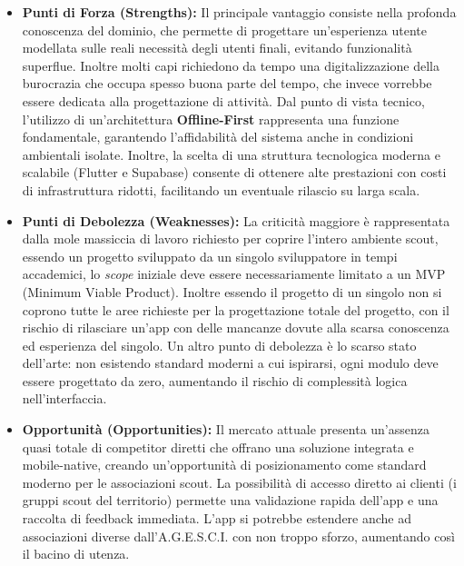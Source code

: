 \documentclass[11pt]{article}
\numberwithin{figure}{section}
\begin{document}
\begin{itemize}[topsep=0.5 pt]
  \item \textbf{Punti di Forza (Strengths):}
  Il principale vantaggio consiste nella profonda conoscenza del dominio, che permette di progettare un'esperienza utente modellata sulle reali necessità degli utenti finali, evitando funzionalità superflue. Inoltre molti capi richiedono da tempo una digitalizzazione della burocrazia che occupa spesso buona parte del tempo, che invece vorrebbe essere dedicata alla progettazione di attività. Dal punto di vista tecnico, l'utilizzo di un'architettura \textbf{Offline-First} rappresenta una funzione fondamentale, garantendo l'affidabilità del sistema anche in condizioni ambientali isolate. Inoltre, la scelta di una struttura tecnologica moderna e scalabile (Flutter e Supabase) consente di ottenere alte prestazioni con costi di infrastruttura ridotti, facilitando un eventuale rilascio su larga scala.

  \item \textbf{Punti di Debolezza (Weaknesses):}
  La criticità maggiore è rappresentata dalla mole massiccia di lavoro richiesto per coprire l'intero ambiente scout, essendo un progetto sviluppato da un singolo sviluppatore in tempi accademici, lo \textit{scope} iniziale deve essere necessariamente limitato a un MVP (Minimum Viable Product). Inoltre essendo il progetto di un singolo non si coprono tutte le aree richieste per la progettazione totale del progetto, con il rischio di rilasciare un'app con delle mancanze dovute alla scarsa conoscenza ed esperienza del singolo. Un altro punto di debolezza è lo scarso stato dell'arte: non esistendo standard moderni a cui ispirarsi, ogni modulo deve essere progettato da zero, aumentando il rischio di complessità logica nell'interfaccia. 

  \item \textbf{Opportunità (Opportunities):}
  Il mercato attuale presenta un'assenza quasi totale di competitor diretti che offrano una soluzione integrata e mobile-native, creando un'opportunità di posizionamento come standard moderno per le associazioni scout. La possibilità di accesso diretto ai clienti (i gruppi scout del territorio) permette una validazione rapida dell'app e una raccolta di feedback immediata. L'app si potrebbe estendere anche ad associazioni diverse dall'A.G.E.S.C.I. con non troppo sforzo, aumentando così il bacino di utenza.


\end{itemize}
\end{document}
